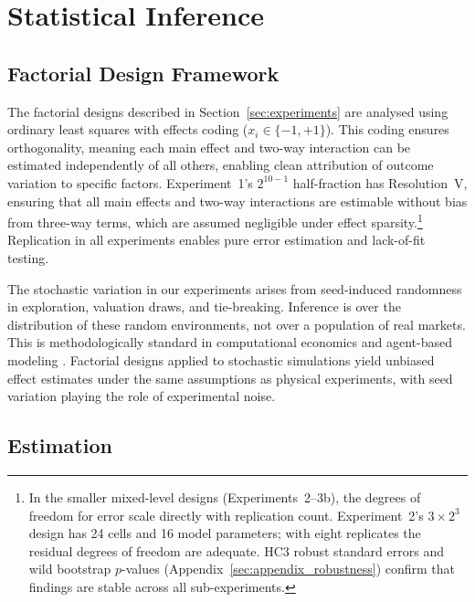 \section{Statistical Inference}
\label{sec:inference}

\subsection{Factorial Design Framework}

The factorial designs described in Section~\ref{sec:experiments} are analysed using ordinary least squares with effects coding ($x_i \in \{-1, +1\}$). This coding ensures orthogonality, meaning each main effect and two-way interaction can be estimated independently of all others, enabling clean attribution of outcome variation to specific factors. Experiment~1's $2^{10-1}$ half-fraction has Resolution~V, ensuring that all main effects and two-way interactions are estimable without bias from three-way terms, which are assumed negligible under effect sparsity.\footnote{In the smaller mixed-level designs (Experiments~2--3b), the degrees of freedom for error scale directly with replication count. Experiment~2's $3 \times 2^3$ design has 24 cells and 16 model parameters; with eight replicates the residual degrees of freedom are adequate. HC3 robust standard errors and wild bootstrap $p$-values (Appendix~\ref{sec:appendix_robustness}) confirm that findings are stable across all sub-experiments.} Replication in all experiments enables pure error estimation and lack-of-fit testing.

The stochastic variation in our experiments arises from seed-induced randomness in exploration, valuation draws, and tie-breaking. Inference is over the distribution of these random environments, not over a population of real markets. This is methodologically standard in computational economics and agent-based modeling \citep{Tesfatsion2006}. Factorial designs applied to stochastic simulations yield unbiased effect estimates under the same assumptions as physical experiments, with seed variation playing the role of experimental noise.

\subsection{Estimation}

